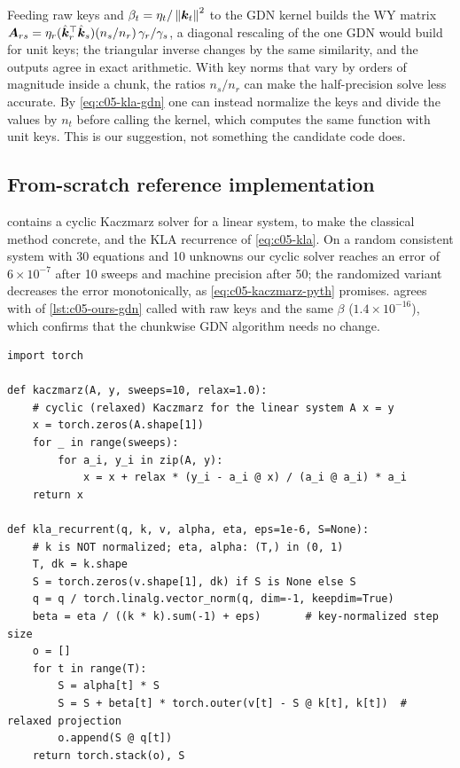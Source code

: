 \begin{pitfall}[title={Pitfall: same mathematics, different conditioning}]
Feeding raw keys and $\beta_t = \eta_t/\left\lVert \bm{k}_t\right\rVert^2$ to the GDN kernel builds the WY matrix
$\bm{A}_{rs} = \eta_r(\hat{\bm{k}}_r^{\top}\hat{\bm{k}}_s)(n_s/n_r)\,\gamma_r/\gamma_s$, a diagonal rescaling of the one
GDN would build for unit keys; the triangular inverse changes by the same similarity, and the
outputs agree in exact arithmetic. With key norms that vary by orders of magnitude inside a chunk,
the ratios $n_s/n_r$ can make the half-precision solve less accurate. By \cref{eq:c05-kla-gdn} one
can instead normalize the keys and divide the values by $n_t$ before calling the kernel, which
computes the same function with unit keys. This is our suggestion, not something the candidate code
does.
\end{pitfall}

\subsection{From-scratch reference implementation}

 contains a cyclic Kaczmarz solver for a linear system, to make the
classical method concrete, and the KLA recurrence of \cref{eq:c05-kla}. On a random consistent
system with 30 equations and 10 unknowns our cyclic solver reaches an error of $6\times10^{-7}$
after 10 sweeps and machine precision after 50; the randomized variant decreases the error
monotonically, as \cref{eq:c05-kaczmarz-pyth} promises.  agrees with
 of \cref{lst:c05-ours-gdn} called with raw keys and the same $\beta$
($1.4\times10^{-16}$), which confirms that the chunkwise GDN algorithm needs no change.

\begin{lstlisting}[caption={Reference implementation (ours): Kaczmarz solver and Kaczmarz linear attention},label={lst:c05-ours-kla}]
import torch

def kaczmarz(A, y, sweeps=10, relax=1.0):
    # cyclic (relaxed) Kaczmarz for the linear system A x = y
    x = torch.zeros(A.shape[1])
    for _ in range(sweeps):
        for a_i, y_i in zip(A, y):
            x = x + relax * (y_i - a_i @ x) / (a_i @ a_i) * a_i
    return x

def kla_recurrent(q, k, v, alpha, eta, eps=1e-6, S=None):
    # k is NOT normalized; eta, alpha: (T,) in (0, 1)
    T, dk = k.shape
    S = torch.zeros(v.shape[1], dk) if S is None else S
    q = q / torch.linalg.vector_norm(q, dim=-1, keepdim=True)
    beta = eta / ((k * k).sum(-1) + eps)       # key-normalized step size
    o = []
    for t in range(T):
        S = alpha[t] * S
        S = S + beta[t] * torch.outer(v[t] - S @ k[t], k[t])  # relaxed projection
        o.append(S @ q[t])
    return torch.stack(o), S
\end{lstlisting}

